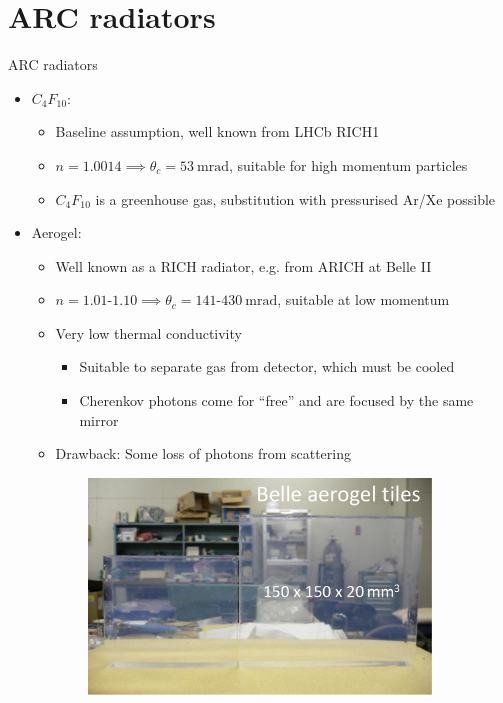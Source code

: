 \documentclass{beamer}
\begin{document}
\section{ARC radiators}
\begin{frame}{ARC radiators}
  \begin{itemize}
    \setlength\itemsep{0.5em}
    \item{$C_4F_{10}$:}
    \begin{itemize}
      \setlength\itemsep{0.2em}
      \item{Baseline assumption, well known from LHCb RICH1}
      \item{$n = 1.0014\implies\theta_c = \SI{53}{\milli\radian}$, suitable for high momentum particles}
      \item{$C_4F_{10}$ is a greenhouse gas, substitution with pressurised Ar/Xe possible}
    \end{itemize}
    \item{Aerogel:}
    \begin{itemize}
      \setlength\itemsep{0.2em}
      \item{Well known as a RICH radiator, e.g. from ARICH at Belle II}
      \item{$n = 1.01$-$1.10\implies\theta_c = 141$-$\SI{430}{\milli\radian}$, suitable at low momentum}
      \item{Very low thermal conductivity}
      \begin{itemize}
        \item{Suitable to separate gas from detector, which must be cooled}
        \item{Cherenkov photons come for ``free'' and are focused by the same mirror}
      \end{itemize}
      \item{Drawback: Some loss of photons from scattering}
    \end{itemize}
  \end{itemize}
  \begin{figure}
    \centering
    \begin{subfigure}{0.25\textwidth}
      \includegraphics[width = 1.0\textwidth]{Plots/BelleAerogelTiles.png}

\end{subfigure}
\end{figure}
\end{frame}
\end{document}
